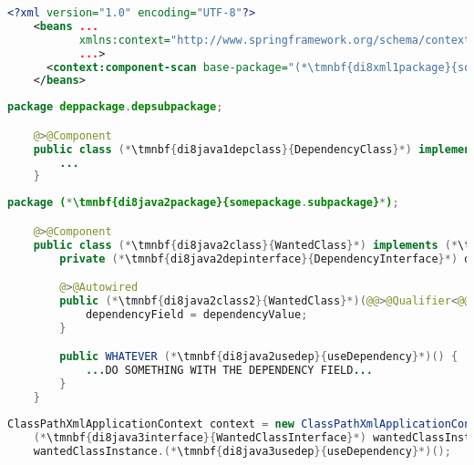 \enlargethispage{20mm}
\thispagestyle{empty}
\begin{lstlisting}[language=XML, title={Configuration XML}]
    <?xml version="1.0" encoding="UTF-8"?>
    <beans ...
           xmlns:context="http://www.springframework.org/schema/context"
           ...>
      <context:component-scan base-package="(*\tmnbf{di8xml1package}{somepackage.subpackage}[ForestGreen]*)"/>
    </beans>
\end{lstlisting}
\begin{lstlisting}[language=Java, title={Dependency class}]
    package deppackage.depsubpackage;

    @>@Component
    public class (*\tmnbf{di8java1depclass}{DependencyClass}*) implements (*\tmnbf{di8java1depinterface}{DependencyInterface}*) {
        ...
    }
\end{lstlisting}
\begin{lstlisting}[language=Java, title={Wanted class with the constructor}]
    package (*\tmnbf{di8java2package}{somepackage.subpackage}*);

    @>@Component
    public class (*\tmnbf{di8java2class}{WantedClass}*) implements (*\tmnbf{di8java2interface}{WantedClassInterface}*) {
        private (*\tmnbf{di8java2depinterface}{DependencyInterface}*) dependencyField;

        @>@Autowired
        public (*\tmnbf{di8java2class2}{WantedClass}*)(@@>@Qualifier<@@("(*\tmnbf{di8java2depbeanid}{dependencyClass}[ForestGreen]*)") (*\tmnbf{di8java2depinterface2}{DependencyInterface}*) dependencyValue) {
            dependencyField = dependencyValue;
        }

        public WHATEVER (*\tmnbf{di8java2usedep}{useDependency}*)() {
            ...DO SOMETHING WITH THE DEPENDENCY FIELD...
        }
    }
\end{lstlisting}
\begin{lstlisting}[language=Java, title={Usage}]
    ClassPathXmlApplicationContext context = new ClassPathXmlApplicationContext("configurationFile.xml");
    (*\tmnbf{di8java3interface}{WantedClassInterface}*) wantedClassInstance = context.getBean("(*\tmnbf{di8java3beanid}{wantedClass}[ForestGreen]*)", (*\tmnbf{di8java3interface2}{WantedClassInterface}*).class);
    wantedClassInstance.(*\tmnbf{di8java3usedep}{useDependency}*)();
\end{lstlisting}
\newpage

